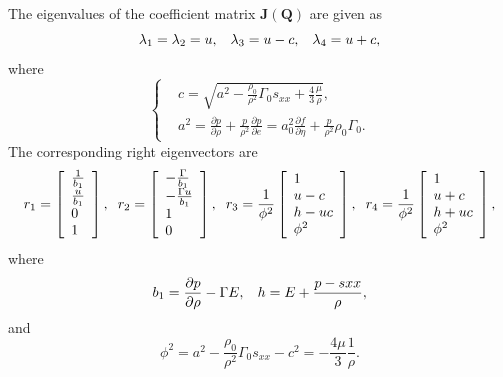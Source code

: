 \documentclass{article}
\numberwithin{equation}{section}
\numberwithin{table}{section}
\begin{document}
The eigenvalues of the coefficient matrix $\bm{J}(\bm{Q})$ are given as
\begin{equation}
  \lambda_1 =\lambda_2 = u, \hspace{0.3cm} \lambda_3 = u-c, \hspace{0.3cm} \lambda_4 = u+c,
\end{equation}
where
\begin{equation}
  \left\{ \begin{aligned}
	  & c = \sqrt{a^2-\frac{\rho_0}{\rho^2}\Gamma_0 s_{xx} +\frac{4}{3}\frac{\mu}{\rho}},\\
	&	a^2 = \frac{\partial p}{\partial \rho} + \frac{p}{\rho^2}\frac{\partial p}{\partial e} = a^2_0 \frac{\partial f}{\partial \eta} + \frac{p}{\rho^2}\rho_0 \Gamma_0.
	  \end{aligned} \right.
	\end{equation}
The corresponding right eigenvectors are
\begin{equation}\label{eq:eiv}
  r_1 = \left[ \begin{array}{l}
	  \frac{1}{b_1} \\
	  \frac{u}{b_1} \\
	  0 \\
	  1 \\
	\end{array}
	\right], \hspace{0.2cm}
	r_2= \left[ \begin{array}{l}
		-\frac{\Gamma}{b_1} \\
		-\frac{\Gamma u}{b_1} \\
		1 \\
		0\\
	  \end{array}
	\right], \hspace{0.2cm}
r_3 =	\frac{1}{\phi^2}\left[\begin{array}{l}
		1 \\
		u-c \\
		h -uc \\
		\phi^2
	  \end{array}
	\right], \hspace{0.2cm}
r_4 = \frac{1}{\phi^2}\left[\begin{array}{l}
		1 \\
		u+c \\
		h +uc \\
		\phi^2
	  \end{array}
	\right],
  \end{equation}
  where
  \begin{equation}
	b_1 = \frac{\partial p}{\partial \rho} - \Gamma E, \hspace{0.3cm} h = E +\frac{p-s{xx}}{\rho},
  \end{equation}
  and
  \begin{equation}
	\phi^2 = a^2 -\frac{\rho_0}{\rho^2} \Gamma_0 s_{xx}-c^2 = -\frac{4\mu}{3}\frac{1}{\rho}.
  \end{equation}
\end{document}
